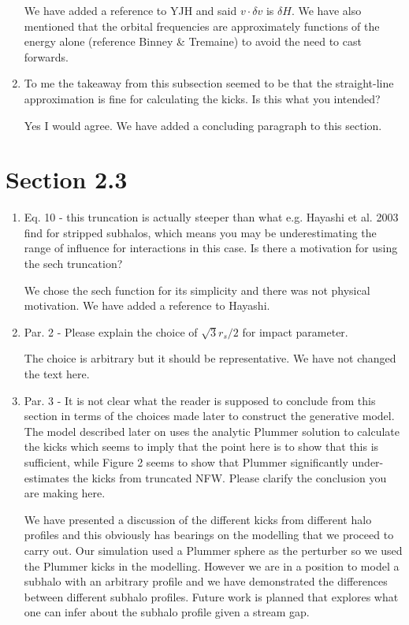 \documentclass{article}
\begin{document}
\begin{enumerate}
{\color{red} We have added a reference to YJH and said $v \cdot \delta v$ is $\delta H$. We have also mentioned that the orbital frequencies are approximately functions of the energy alone (reference Binney \& Tremaine) to avoid the need to cast forwards.}


\item To me the takeaway from this subsection seemed to be that the straight-line
approximation is fine for calculating the kicks. Is this what you intended?

{\color{red} Yes I would agree. We have added a concluding paragraph to this section.}

\end{enumerate}

\section{Section 2.3}
\begin{enumerate}


\item Eq. 10 - this truncation is actually steeper than what e.g. Hayashi et al. 2003 find for
stripped subhalos, which means you may be underestimating the range of influence for
interactions in this case. Is there a motivation for using the sech truncation?

{\color{red} We chose the sech function for its simplicity and there was not physical motivation. We have added a reference to Hayashi.}

\item Par. 2 - Please explain the choice of $\sqrt{3} r_s/2$ for impact parameter.

{\color{red} The choice is arbitrary but it should be representative. We have not changed the text here.}

\item Par. 3 - It is not clear what the reader is supposed to conclude from this section in terms
of the choices made later to construct the generative model. The model described later
on uses the analytic Plummer solution to calculate the kicks which seems to imply that
the point here is to show that this is sufficient, while Figure 2 seems to show that
Plummer significantly under-estimates the kicks from truncated NFW. Please clarify the
conclusion you are making here.

{\color{red} We have presented a discussion of the different kicks from different halo profiles and this obviously has bearings on the modelling that we proceed to carry out. Our simulation used a Plummer sphere as the perturber so we used the Plummer kicks in the modelling. However we are in a position to model a subhalo with an arbitrary profile and we have demonstrated the differences between different subhalo profiles. Future work is planned that explores what one can infer about the subhalo profile given a stream gap.}

\end{enumerate}
\end{document}
